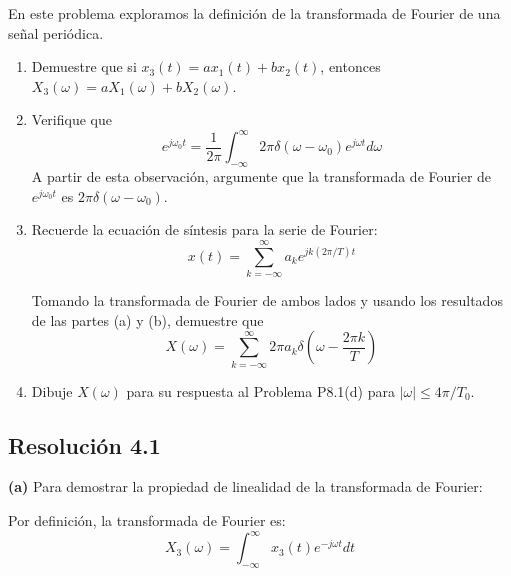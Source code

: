 \documentclass[
  11pt,
  letterpaper,
   addpoints,
   answers
  ]{exam}
\begin{document}
\begin{questions}
\begin{solution}
\begin{itemize}
\end{itemize}
\end{solution}
\question En este problema exploramos la definición de la transformada de Fourier de una señal periódica.

\begin{enumerate}
    \item Demuestre que si $x_3(t) = ax_1(t) + bx_2(t)$, entonces $X_3(\omega) = aX_1(\omega) + bX_2(\omega)$.
    
    \item Verifique que
    \begin{equation}
        e^{j\omega_0 t} = \frac{1}{2\pi} \int_{-\infty}^{\infty} 2\pi\delta(\omega - \omega_0)e^{j\omega t} d\omega
    \end{equation}
    A partir de esta observación, argumente que la transformada de Fourier de $e^{j\omega_0 t}$ es $2\pi\delta(\omega - \omega_0)$.
    
    \item Recuerde la ecuación de síntesis para la serie de Fourier:
    \begin{equation}
        x(t) = \sum_{k=-\infty}^{\infty} a_k e^{jk(2\pi/T)t}
    \end{equation}
    
    Tomando la transformada de Fourier de ambos lados y usando los resultados de las partes (a) y (b), demuestre que
    \begin{equation}
        X(\omega) = \sum_{k=-\infty}^{\infty} 2\pi a_k \delta\left(\omega - \frac{2\pi k}{T}\right)
    \end{equation}
    
    \item Dibuje $X(\omega)$ para su respuesta al Problema P8.1(d) para $|\omega| \leq 4\pi/T_0$.
\end{enumerate}
\begin{solution}
\subsection*{Resolución 4.1}

\textbf{(a)} Para demostrar la propiedad de linealidad de la transformada de Fourier:

Por definición, la transformada de Fourier es:
\begin{equation}
X_3(\omega) = \int_{-\infty}^{\infty} x_3(t)e^{-j\omega t} dt
\end{equation}


\end{solution}
\end{questions}
\end{document}
